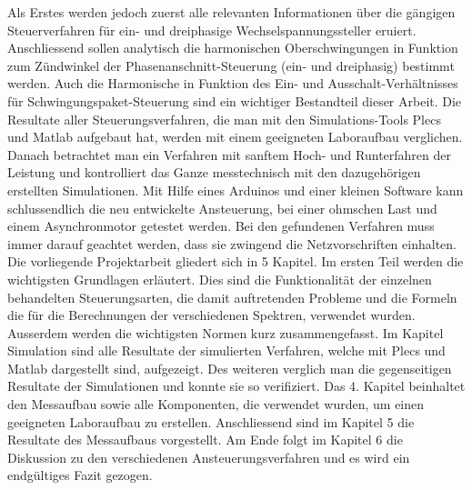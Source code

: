 Als Erstes werden jedoch zuerst alle relevanten Informationen über die gängigen Steuerverfahren für ein- und dreiphasige Wechselspannungssteller eruiert. Anschliessend sollen analytisch die harmonischen Oberschwingungen in Funktion zum Zündwinkel der Phasenanschnitt-Steuerung (ein- und dreiphasig) bestimmt werden. Auch die Harmonische in Funktion des Ein- und Ausschalt-Verhältnisses für Schwingungspaket-Steuerung sind ein wichtiger Bestandteil dieser Arbeit. Die Resultate aller Steuerungsverfahren, die man mit den Simulations-Tools Plecs und Matlab aufgebaut hat, werden mit einem geeigneten Laboraufbau verglichen. Danach betrachtet man ein Verfahren mit sanftem Hoch- und Runterfahren der Leistung und kontrolliert das Ganze messtechnisch mit den dazugehörigen erstellten Simulationen. Mit Hilfe eines Arduinos und einer kleinen Software kann schlussendlich die neu entwickelte Ansteuerung, bei einer ohmschen Last und einem Asynchronmotor getestet werden. Bei den gefundenen Verfahren muss immer darauf geachtet werden, dass sie zwingend die Netzvorschriften einhalten.\\
Die vorliegende Projektarbeit gliedert sich in 5 Kapitel. Im ersten Teil werden die wichtigsten Grundlagen erläutert. Dies sind die Funktionalität der einzelnen behandelten Steuerungsarten, die damit auftretenden Probleme und die Formeln die für die Berechnungen der verschiedenen Spektren, verwendet wurden. Ausserdem werden die wichtigsten Normen kurz zusammengefasst. Im Kapitel Simulation sind alle Resultate der simulierten Verfahren, welche mit Plecs und Matlab dargestellt sind, aufgezeigt. Des weiteren verglich man die gegenseitigen Resultate der Simulationen und konnte sie so verifiziert. Das 4. Kapitel beinhaltet den Messaufbau sowie alle Komponenten, die verwendet wurden, um einen geeigneten Laboraufbau zu erstellen. Anschliessend sind im Kapitel 5 die Resultate des Messaufbaus vorgestellt. Am Ende folgt im Kapitel 6 die Diskussion zu den verschiedenen Ansteuerungsverfahren und es wird ein endgültiges Fazit gezogen.





















